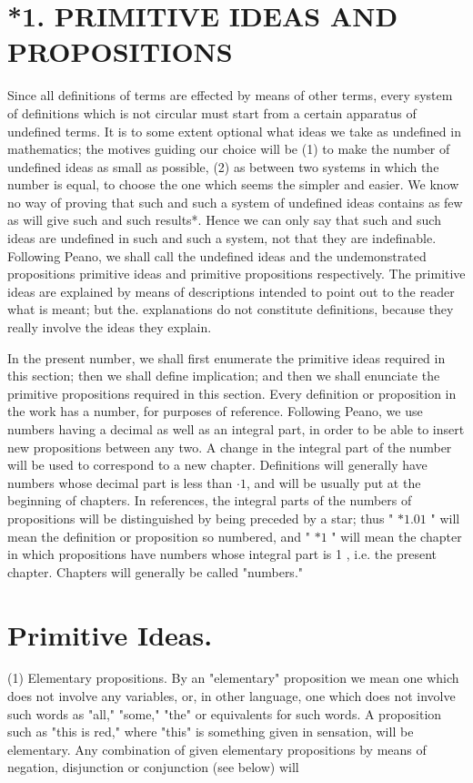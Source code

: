 \documentclass[10pt]{article}
\begin{document}
\section*{*1. PRIMITIVE IDEAS AND PROPOSITIONS}
Since all definitions of terms are effected by means of other terms, every system of definitions which is not circular must start from a certain apparatus of undefined terms. It is to some extent optional what ideas we take as undefined in mathematics; the motives guiding our choice will be (1) to make the number of undefined ideas as small as possible, (2) as between two systems in which the number is equal, to choose the one which seems the simpler and easier. We know no way of proving that such and such a system of undefined ideas contains as few as will give such and such results*. Hence we can only say that such and such ideas are undefined in such and such a system, not that they are indefinable. Following Peano, we shall call the undefined ideas and the undemonstrated propositions primitive ideas and primitive propositions respectively. The primitive ideas are explained by means of descriptions intended to point out to the reader what is meant; but the. explanations do not constitute definitions, because they really involve the ideas they explain.

In the present number, we shall first enumerate the primitive ideas required in this section; then we shall define implication; and then we shall enunciate the primitive propositions required in this section. Every definition or proposition in the work has a number, for purposes of reference. Following Peano, we use numbers having a decimal as well as an integral part, in order to be able to insert new propositions between any two. A change in the integral part of the number will be used to correspond to a new chapter. Definitions will generally have numbers whose decimal part is less than $\cdot 1$, and will be usually put at the beginning of chapters. In references, the integral parts of the numbers of propositions will be distinguished by being preceded by a star; thus " $* 1.01$ " will mean the definition or proposition so numbered, and " $* 1$ " will mean the chapter in which propositions have numbers whose integral part is 1 , i.e. the present chapter. Chapters will generally be called "numbers."

\section*{Primitive Ideas.}
(1) Elementary propositions. By an "elementary" proposition we mean one which does not involve any variables, or, in other language, one which does not involve such words as "all," "some," "the" or equivalents for such words. A proposition such as "this is red," where "this" is something given in sensation, will be elementary. Any combination of given elementary propositions by means of negation, disjunction or conjunction (see below) will
\end{document}
